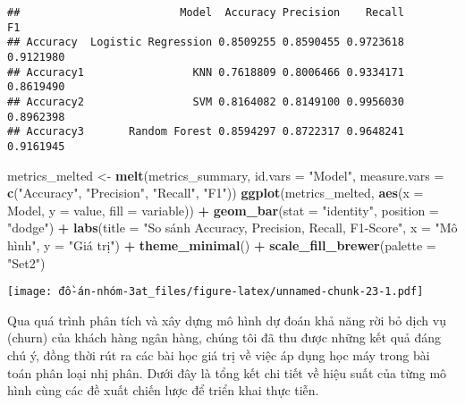 \documentclass[
]{article}
\newenvironment{Shaded}{\begin{snugshade}}{\end{snugshade}}
\newcommand{\AttributeTok}[1]{\textcolor[rgb]{0.13,0.29,0.53}{#1}}
\newcommand{\FunctionTok}[1]{\textcolor[rgb]{0.13,0.29,0.53}{\textbf{#1}}}
\newcommand{\NormalTok}[1]{#1}
\newcommand{\OtherTok}[1]{\textcolor[rgb]{0.56,0.35,0.01}{#1}}
\newcommand{\SpecialCharTok}[1]{\textcolor[rgb]{0.81,0.36,0.00}{\textbf{#1}}}
\newcommand{\StringTok}[1]{\textcolor[rgb]{0.31,0.60,0.02}{#1}}
\begin{document}
\begin{verbatim}
##                         Model  Accuracy Precision    Recall        F1
## Accuracy  Logistic Regression 0.8509255 0.8590455 0.9723618 0.9121980
## Accuracy1                 KNN 0.7618809 0.8006466 0.9334171 0.8619490
## Accuracy2                 SVM 0.8164082 0.8149100 0.9956030 0.8962398
## Accuracy3       Random Forest 0.8594297 0.8722317 0.9648241 0.9161945
\end{verbatim}

\begin{Shaded}
\begin{Highlighting}[]
\NormalTok{metrics\_melted }\OtherTok{\textless{}{-}} \FunctionTok{melt}\NormalTok{(metrics\_summary, }\AttributeTok{id.vars =} \StringTok{"Model"}\NormalTok{, }
                       \AttributeTok{measure.vars =} \FunctionTok{c}\NormalTok{(}\StringTok{"Accuracy"}\NormalTok{, }\StringTok{"Precision"}\NormalTok{, }\StringTok{"Recall"}\NormalTok{, }\StringTok{"F1"}\NormalTok{))}
\FunctionTok{ggplot}\NormalTok{(metrics\_melted, }\FunctionTok{aes}\NormalTok{(}\AttributeTok{x =}\NormalTok{ Model, }\AttributeTok{y =}\NormalTok{ value, }\AttributeTok{fill =}\NormalTok{ variable)) }\SpecialCharTok{+}
  \FunctionTok{geom\_bar}\NormalTok{(}\AttributeTok{stat =} \StringTok{"identity"}\NormalTok{, }\AttributeTok{position =} \StringTok{"dodge"}\NormalTok{) }\SpecialCharTok{+}
  \FunctionTok{labs}\NormalTok{(}\AttributeTok{title =} \StringTok{"So sánh Accuracy, Precision, Recall, F1{-}Score"}\NormalTok{, }\AttributeTok{x =} \StringTok{"Mô hình"}\NormalTok{, }\AttributeTok{y =} \StringTok{"Giá trị"}\NormalTok{) }\SpecialCharTok{+}
  \FunctionTok{theme\_minimal}\NormalTok{() }\SpecialCharTok{+} \FunctionTok{scale\_fill\_brewer}\NormalTok{(}\AttributeTok{palette =} \StringTok{"Set2"}\NormalTok{)}
\end{Highlighting}
\end{Shaded}

\texttt{[image: đồ-án-nhóm-3at\_files/figure-latex/unnamed-chunk-23-1.pdf]}

Qua quá trình phân tích và xây dựng mô hình dự đoán khả năng rời bỏ dịch
vụ (churn) của khách hàng ngân hàng, chúng tôi đã thu được những kết quả
đáng chú ý, đồng thời rút ra các bài học giá trị về việc áp dụng học máy
trong bài toán phân loại nhị phân. Dưới đây là tổng kết chi tiết về hiệu
suất của từng mô hình cùng các đề xuất chiến lược để triển khai thực
tiễn.
\end{document}
